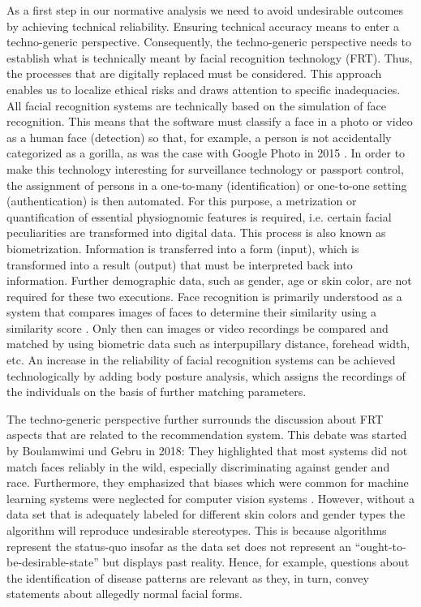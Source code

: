 \documentclass[manuscript,screen]{acmart}
\begin{document}
As a first step in our normative analysis we need to avoid undesirable outcomes by achieving technical reliability. Ensuring technical accuracy means to enter a techno-generic perspective. Consequently, the techno-generic perspective needs to establish what is technically meant by facial recognition technology (FRT). Thus, the processes that are digitally replaced must be considered. This approach enables us to localize ethical risks and draws attention to specific inadequacies. All facial recognition systems are technically based on the simulation of face recognition. This means that the software must classify a face in a photo or video as a human face (detection) so that, for example, a person is not accidentally categorized as a gorilla, as was the case with Google Photo in 2015 \citep{grush2015google}. In order to make this technology interesting for surveillance technology or passport control, the assignment of persons in a one-to-many (identification) or one-to-one setting (authentication) is then automated. For this purpose, a metrization or quantification of essential physiognomic features is required, i.e. certain facial peculiarities are transformed into digital data. This process is also known as biometrization. Information is transferred into a form (input), which is transformed into a result (output) that must be interpreted back into information. Further demographic data, such as gender, age or skin color, are not required for these two executions. Face recognition is primarily understood as a system that compares images of faces to determine their similarity using a similarity score \citep{mclaughlin2020critics}. Only then can images or video recordings be compared and matched by using biometric data such as interpupillary distance, forehead width, etc. An increase in the reliability of facial recognition systems can be achieved technologically by adding body posture analysis, which assigns the recordings of the individuals on the basis of further matching parameters. 

The techno-generic perspective further surrounds the discussion about FRT aspects that are related to the recommendation system. This debate was started by Boulamwimi und Gebru in 2018: They highlighted that most systems did not match faces reliably in the wild, especially discriminating against gender and race. Furthermore, they emphasized that biases which were common for machine learning systems were neglected for computer vision systems \citep{raji2020saving}. However, without a data set that is adequately labeled for different skin colors and gender types the algorithm will reproduce undesirable stereotypes. This is because algorithms represent the status-quo insofar as the data set does not represent an “ought-to-be-desirable-state” but displays past reality. Hence, for example, questions about the identification of disease patterns are relevant as they, in turn, convey statements about allegedly normal facial forms.
\end{document}
